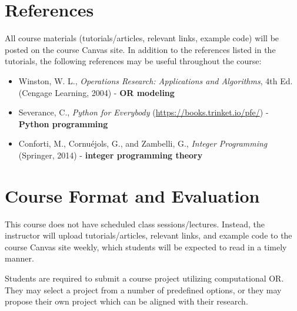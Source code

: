 \documentclass[12pt]{article}
\begin{document}
\section*{References}
All course materials (tutorials/articles, relevant links, example code) will be posted on the course Canvas site. In addition to the references listed in the tutorials, the following references may be useful throughout the course:
\begin{itemize}
    \item Winston, W. L., \emph{Operations Research: Applications and Algorithms}, 4th Ed. (Cengage Learning, 2004) - \textbf{OR modeling}
    \item Severance, C., \emph{Python for Everybody} (\url{https://books.trinket.io/pfe/}) - \textbf{Python programming}
    \item Conforti, M., Cornu\'{e}jols, G., and Zambelli, G., \emph{Integer Programming} (Springer, 2014) - \textbf{integer programming theory}
\end{itemize}

\section*{Course Format and Evaluation}
This course does not have scheduled class sessions/lectures. Instead, the instructor will upload tutorials/articles, relevant links, and example code to the course Canvas site weekly, which students will be expected to read in a timely manner.

Students are required to submit a course project utilizing computational OR. They may select a project from a number of predefined options, or they may propose their own project which can be aligned with their research.
\end{document}
